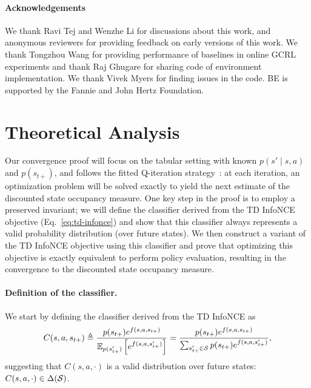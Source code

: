 \documentclass{article} %
\begin{document}
\paragraph{Acknowledgements}

We thank Ravi Tej and Wenzhe Li for discussions about this work, and anonymous reviewers for providing feedback on early versions of this work. We thank Tongzhou Wang for providing performance of baselines in online GCRL experiments and thank Raj Ghugare for sharing code of environment implementation. We thank Vivek Myers for finding issues in the code. BE is supported by the Fannie and John Hertz Foundation.





\clearpage
\appendix

\section{Theoretical Analysis}
\label{appendix:theoretical-analysis}

Our convergence proof will focus on the tabular setting with known $p(s' \mid s, a)$ and $p(s_{t+})$, and follows the fitted Q-iteration strategy~\citep{fu2019diagnosing, ernst2005tree, bertsekas1995neuro}: at each iteration, an optimization problem will be solved exactly to yield the next estimate of the discounted state occupancy measure. One key step in the proof is to employ a preserved invariant; we will define the classifier derived from the TD InfoNCE objective (Eq.~\ref{eq:td-infonce}) and show that this classifier always represents a valid probability distribution (over future states).
We then construct a variant of the TD InfoNCE objective using this classifier and prove that optimizing this objective is exactly equivalent to perform policy evaluation, resulting in the convergence to the discounted state occupancy measure.

\paragraph{Definition of the classifier.} We start by defining the classifier derived from the TD InfoNCE as
\begin{align}
    C(s, a, s_{t+}) \triangleq \frac{p(s_{t+}) e^{f(s, a, s_{t+})}}{ \mathbb{E}_{p(s_{t+}')}\left[ e^{f(s, a, s_{t+}')} \right]} = \frac{p(s_{t+}) e^{f(s, a, s_{t+})}}{ \sum_{s_{t+}' \in {\mathcal{S}}} p(s_{t+}) e^{f(s, a, s_{t+}')}},
    \label{eq:classifier}
\end{align}
suggesting that $C(s, a, \cdot)$ is a valid distribution over future states: $C(s, a, \cdot) \in \Delta({\mathcal{S}})$. 
\end{document}

